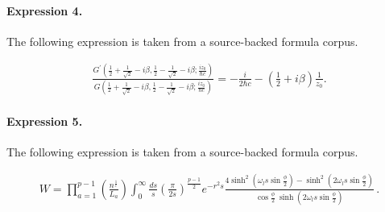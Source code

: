 \documentclass[11pt]{article}
\begin{document}
\paragraph{Expression 4.} The following expression is taken from a source-backed formula corpus.

\begin{align*}\frac{G^{\prime}(\frac{1}{2} + \frac{1}{\sqrt{2}} -i{\beta},\frac{1}{2} - \frac{1}{\sqrt{2}} -i{\beta}; \frac{iz_0}{{\hbar}c})}{G(\frac{1}{2} + \frac{1}{\sqrt{2}} -i{\beta},\frac{1}{2} - \frac{1}{\sqrt{2}} -i{\beta}; \frac{iz_0}{{\hbar}c} )}= - \frac{i}{2{\hbar}c} - (\frac{1}{2} +i{\beta})\frac{1}{z_0}.\end{align*}

\paragraph{Expression 5.} The following expression is taken from a source-backed formula corpus.

\begin{align*} W= \prod_{a=1}^{p-1} \left( \frac{n^{\frac{1}{l}}}{L_a} \right)\int_0^{\infty} \frac{ds}{s}\left ( \frac{\pi}{2s} \right )^{\frac{p-1}{2}} e^{-r^2s} \frac{4\sinh^2(\omega_ls\sin{\frac{\phi}{2}}) - \sinh^2(2\omega_ls\sin{\frac{\phi}{2}})} {\cos{\frac{\phi}{2}}~\sinh(2\omega_ls\sin{\frac{\phi}{2}})}\,.\end{align*}
\end{document}
